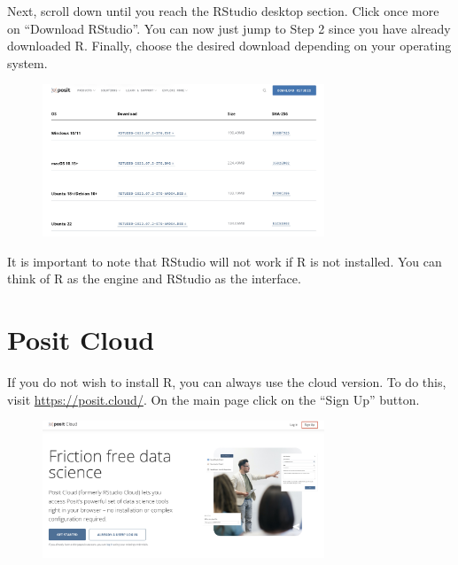 \documentclass[
  letterpaper,
  DIV=11,
  numbers=noendperiod]{scrreprt}
\begin{document}
Next, scroll down until you reach the RStudio desktop section. Click
once more on ``Download RStudio''. You can now just jump to Step 2 since
you have already downloaded R. Finally, choose the desired download
depending on your operating system.

\begin{figure}

{\centering \includegraphics[width=0.75\textwidth,height=\textheight]{./images/Desktop.jpeg}

}

\end{figure}

It is important to note that RStudio will not work if R is not
installed. You can think of R as the engine and RStudio as the
interface.

\hypertarget{posit-cloud}{%
\section*{Posit Cloud}\label{posit-cloud}}


If you do not wish to install R, you can always use the cloud version.
To do this, visit \url{https://posit.cloud/}. On the main page click on
the ``Sign Up'' button.

\begin{figure}

{\centering \includegraphics[width=0.75\textwidth,height=\textheight]{./images/Cloud.jpeg}

}

\end{figure}
\end{document}
